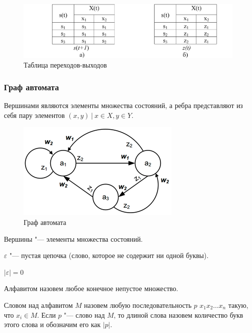 \begin{figure}[h!]
    \centering
    \includegraphics[scale=0.7]{table.png}
    \caption{Таблица переходов-выходов}
\end{figure}

\subsubsection{Граф автомата}

Вершинами являются элементы множества состояний, а ребра представляют из себя
пару элементов $(x,y) ~|~ x \in X, y \in Y$.


\begin{figure}[H]
    \centering
    \includegraphics[scale=0.7]{graph.png}
    \caption{Граф автомата}
\end{figure}

Вершины "--- элементы множества состояний.

$\varepsilon$ "--- пустая цепочка (слово, которое не содержит ни одной буквы).

$|\varepsilon| = 0$


\begin{definition}
    Алфавитом назовем любое конечное непустое множество.
\end{definition}

\begin{definition}
    Словом над алфавитом $M$ назовем любую последовательность $p$ $x_1 x_2 \dots x_n$ такую, что
    $x_i \in M$. Если $p$ "--- слово над $M$, то длиной слова назовем количество
    букв этого слова и обозначим его как $|p|$.
\end{definition}

